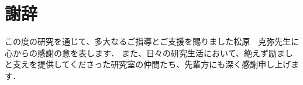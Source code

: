 \chapter*{謝辞}
\thispagestyle{fancy}


この度の研究を通じて、多大なるご指導とご支援を賜りました松原　克弥先生に心からの感謝の意を表します．
また、日々の研究生活において、絶えず励ましと支えを提供してくださった研究室の仲間たち、先輩方にも深く感謝申し上げます．



